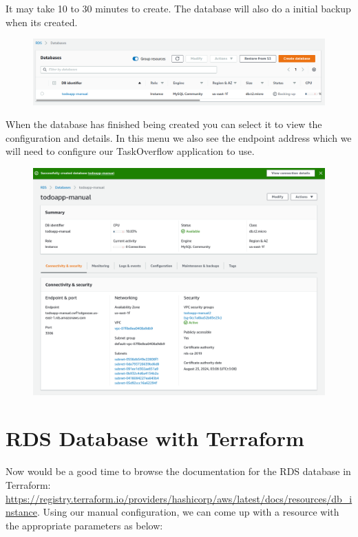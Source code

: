\documentclass{csse4400}
\begin{document}
It may take 10 to 30 minutes to create.
The database will also do a initial backup when its created.

\begin{figure}[H]
  \includegraphics[width=\textwidth]{images/aws_4}
\end{figure}

When the database has finished being created you can select it to view the configuration and details.
In this menu we also see the endpoint address which we will need to configure our TaskOverflow application to use.

\begin{figure}[H]
  \includegraphics[width=\textwidth]{images/aws_5}
\end{figure}

\section{RDS Database with Terraform}

Now would be a good time to browse the documentation for the RDS database in Terraform:
\url{https://registry.terraform.io/providers/hashicorp/aws/latest/docs/resources/db_instance}.
Using our manual configuration, we can come up with a resource with the appropriate parameters as below:
\end{document}
